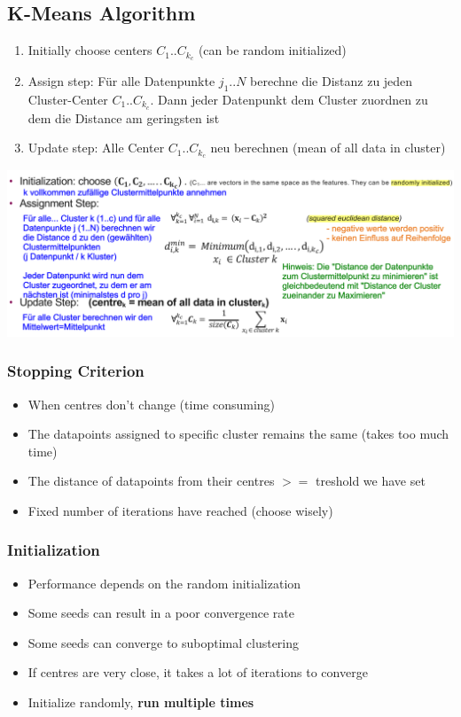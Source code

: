 \subsection{K-Means Algorithm}
\begin{enumerate}
    \item Initially choose centers $C_1..C_{k_c}$ (can be random initialized)
    \item Assign step: Für alle Datenpunkte $j_1..N$ berechne die Distanz zu jeden Cluster-Center $C_1..C_{k_c}$. Dann jeder Datenpunkt dem Cluster zuordnen zu dem die Distance am geringsten ist
    \item Update step: Alle Center $C_1..C_{k_c}$ neu berechnen (mean of all data in cluster)
\end{enumerate}
\includegraphics[width=\linewidth]{./img/w12_clustering_knn.png}

\subsubsection{Stopping Criterion}
\begin{itemize}
    \item When centres don't change (time consuming)
    \item The datapoints assigned to specific cluster remains the same (takes too much time)
    \item The distance of datapoints from their centres $>=$ treshold we have set
    \item Fixed number of iterations have reached (choose wisely)
\end{itemize}

\subsubsection{Initialization}
\begin{itemize}
    \item Performance depends on the random initialization
    \item Some seeds can result in a poor convergence rate
    \item Some seeds can converge to suboptimal clustering
    \item If centres are very close, it takes a lot of iterations to converge
    \item Initialize randomly, \textbf{run multiple times}
\end{itemize}

